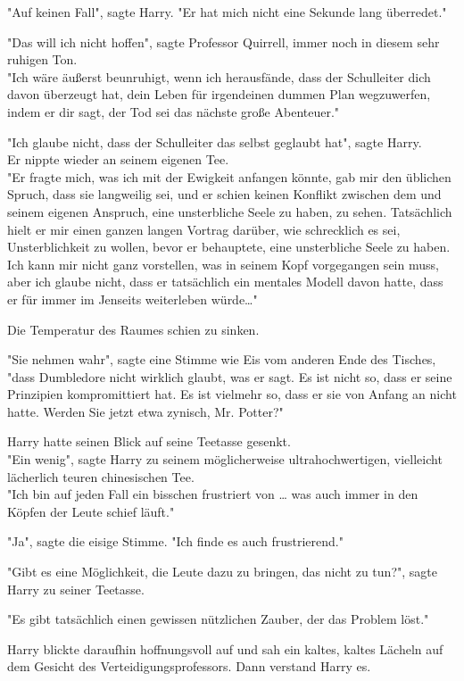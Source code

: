 {"Auf keinen Fall", sagte Harry. "Er hat mich nicht eine Sekunde lang überredet."

"Das will ich nicht hoffen", sagte Professor Quirrell, immer noch in diesem sehr ruhigen Ton.\\ "Ich wäre äußerst beunruhigt, wenn ich herausfände, dass der Schulleiter dich davon überzeugt hat, dein Leben für irgendeinen dummen Plan wegzuwerfen, indem er dir sagt, der Tod sei das nächste große Abenteuer."

"Ich glaube nicht, dass der Schulleiter das selbst geglaubt hat", sagte Harry.\\ Er nippte wieder an seinem eigenen Tee.\\ "Er fragte mich, was ich mit der Ewigkeit anfangen könnte, gab mir den üblichen Spruch, dass sie langweilig sei, und er schien keinen Konflikt zwischen dem und seinem eigenen Anspruch, eine unsterbliche Seele zu haben, zu sehen. Tatsächlich hielt er mir einen ganzen langen Vortrag darüber, wie schrecklich es sei, Unsterblichkeit zu wollen, bevor er behauptete, eine unsterbliche Seele zu haben. Ich kann mir nicht ganz vorstellen, was in seinem Kopf vorgegangen sein muss, aber ich glaube nicht, dass er tatsächlich ein mentales Modell davon hatte, dass er für immer im Jenseits weiterleben würde…"

Die Temperatur des Raumes schien zu sinken.

"Sie nehmen wahr", sagte eine Stimme wie Eis vom anderen Ende des Tisches, "dass Dumbledore nicht wirklich glaubt, was er sagt. Es ist nicht so, dass er seine Prinzipien kompromittiert hat. Es ist vielmehr so, dass er sie von Anfang an nicht hatte. Werden Sie jetzt etwa zynisch, Mr. Potter?"

Harry hatte seinen Blick auf seine Teetasse gesenkt.\\ "Ein wenig", sagte Harry zu seinem möglicherweise ultrahochwertigen, vielleicht lächerlich teuren chinesischen Tee.\\ "Ich bin auf jeden Fall ein bisschen frustriert von … was auch immer in den Köpfen der Leute schief läuft."

"Ja", sagte die eisige Stimme. "Ich finde es auch frustrierend."

"Gibt es eine Möglichkeit, die Leute dazu zu bringen, das nicht zu tun?", sagte Harry zu seiner Teetasse.

"Es gibt tatsächlich einen gewissen nützlichen Zauber, der das Problem löst."

Harry blickte daraufhin hoffnungsvoll auf und sah ein kaltes, kaltes Lächeln auf dem Gesicht des Verteidigungsprofessors. Dann verstand Harry es.

}
